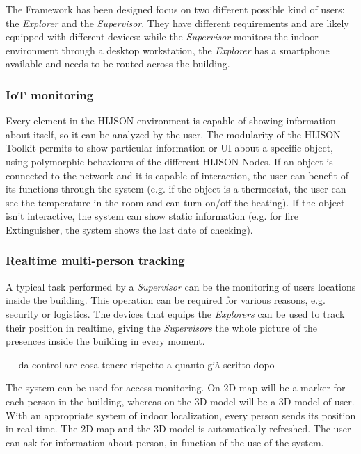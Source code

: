 \documentclass{sig-alternate}
\begin{document}
The Framework has been designed focus on two different possible kind of
users: the \emph{Explorer} and the \emph{Supervisor}. They have
different requirements and are likely equipped with different devices:
while the \emph{Supervisor} monitors the indoor environment through a
desktop workstation, the \emph{Explorer} has a smartphone available and
needs to be routed across the building.

\subsubsection{IoT monitoring}\label{iot-monitoring}

Every element in the HIJSON environment is capable of showing information
about itself,  so it can be analyzed by the user. The modularity of the HIJSON
Toolkit permits to show  particular information or UI about a specific object,
using polymorphic behaviours of the different HIJSON Nodes. If an object is
connected to the network and it is capable of interaction, the user can
benefit of its functions through the system (e.g. if the object is a
thermostat, the user can see the temperature in the room and can turn on/off
the heating). If the object isn't interactive, the system can show static
information (e.g. for fire Extinguisher, the system shows the last date of
checking).

\subsubsection{Realtime multi-person tracking}\label{realtime-multi-person-tracking}

A typical task performed by a \emph{Supervisor} can be the monitoring of users
locations  inside the building. This operation can be required for various
reasons, e.g. security or  logistics. The devices that equips the
\emph{Explorers} can be used to track their position  in realtime, giving the
\emph{Supervisors} the whole picture of the presences inside the  building in
every moment.

--- da controllare cosa tenere rispetto a quanto già scritto dopo ---

The system can be used for access monitoring. On 2D map will be a marker
for each person in the building, whereas on the 3D model will be a 3D
model of user. With an appropriate system of indoor localization, every
person sends its position in real time. The 2D map and the 3D model is
automatically refreshed. The user can ask for information about person,
in function of the use of the system.
\end{document}
